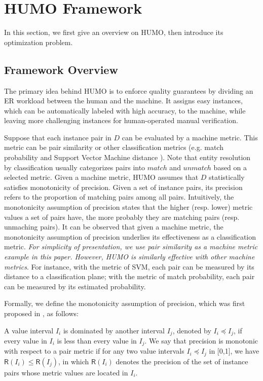\section{HUMO Framework} \label{sec:framework}

  In this section, we first give an overview on HUMO, then introduce its optimization problem.


\subsection{Framework Overview}

    The primary idea behind HUMO is to enforce quality guarantees by dividing an ER workload between the human and the machine. It assigns easy instances, which can be automatically labeled with high accuracy, to the machine, while leaving more challenging instances for human-operated manual verification.

		
		Suppose that each instance pair in $D$ can be evaluated by a machine metric. This metric can be pair similarity or other classification metrics (e.g. match probability \cite{fellegi1969theory} and Support Vector Machine distance \cite{kopcke2010evaluation}). Note that entity resolution by classification usually categorizes pairs into $match$ and $unmatch$ based on a selected metric. Given a machine metric, HUMO assumes that $D$ statistically satisfies monotonicity of precision. Given a set of instance pairs, its precision refers to the proportion of matching pairs among all pairs. Intuitively, the monotonicity assumption of precision states that the higher (resp. lower) metric values a set of pairs have, the more probably they are matching pairs (resp. unmaching pairs). It can be observed that given a machine metric, the monotonicity assumption of precision underlies its effectiveness as a classification metric. {\em For simplicity of presentation, we use pair similarity as a machine metric example in this paper. However, HUMO is similarly effective with other machine metrics}. For instance, with the metric of SVM, each pair can be measured by its distance to a classification plane; with the metric of match probability, each pair can be measured by its estimated probability.
			
		
 Formally, we define the monotonicity assumption of precision, which was first proposed in \cite{arasu2010active}, as follows:
\begin{assumption}
  A value interval $I_i$ is dominated by another interval $I_j$, denoted by $I_i\preceq I_j$, if every value in $I_i$ is less than every value in $I_j$. We say that precision is monotonic with respect to a pair metric if for any two value intervals $I_i\preceq I_j$ in [0,1], we have $\mathsf{R}(I_i)\leq\mathsf{R}(I_j)$, in which $\mathsf{R}(I_i)$ denotes the precision of the set of instance pairs whose metric values are located in $I_i$.
\label{monotonicity}
\end{assumption}


